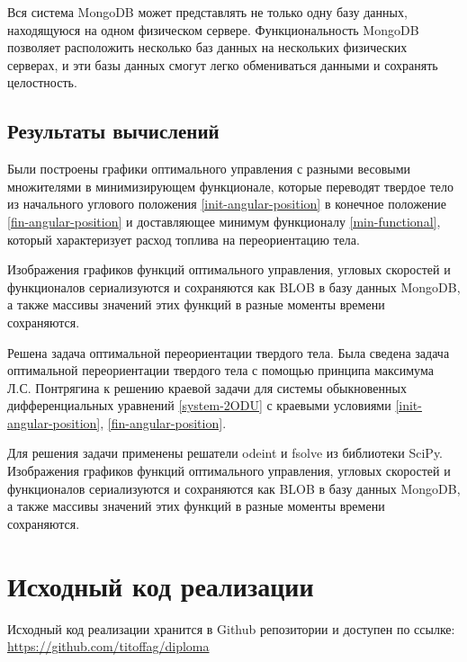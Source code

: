 \documentclass[14pt]{extreport}
\begin{document}
Вся система MongoDB может представлять не только одну базу данных, находящуюся на одном физическом сервере. Функциональность MongoDB позволяет расположить несколько баз данных на нескольких физических серверах, и эти базы данных смогут легко обмениваться данными и сохранять целостность.

\section{Результаты вычислений}
Были построены графики оптимального управления с разными весовыми множителями в минимизирующем функционале, которые переводят твердое тело из начального углового положения \eqref{init-angular-position} в конечное положение \eqref{fin-angular-position} и доставляющее минимум функционалу \eqref{min-functional}, который характеризует расход топлива на переориентацию тела.

Изображения графиков функций оптимального управления, угловых скоростей и функционалов сериализуются и сохраняются как BLOB в базу данных MongoDB, а также массивы значений этих функций в разные моменты времени сохраняются.

\conclusions

Решена задача оптимальной переориентации твердого тела. Была сведена задача оптимальной переориентации твердого тела с помощью принципа максимума Л.С. Понтрягина к решению краевой задачи для системы обыкновенных дифференциальных уравнений \eqref{system-2ODU} с краевыми условиями \eqref{init-angular-position}, \eqref{fin-angular-position}.
 
Для решения задачи применены решатели odeint и fsolve из библиотеки SciPy. Изображения графиков функций оптимального управления, угловых скоростей и функционалов сериализуются и сохраняются как BLOB в базу данных MongoDB, а также массивы значений этих функций в разные моменты времени сохраняются.


\nocite{*}


\Appendix

\chapter{Исходный код реализации}
Исходный код реализации хранится в Github репозитории и доступен по ссылке: \href{https://github.com/titoffag/diploma}{https://github.com/titoffag/diploma}
\end{document}
